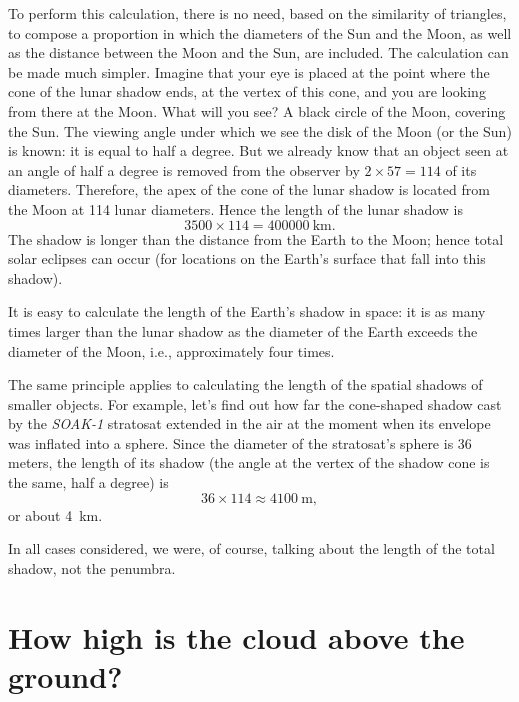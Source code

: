 To perform this calculation, there is no need, based on the similarity of triangles, to compose a proportion in which the diameters of the Sun and the Moon, as well as the distance between the Moon and the Sun, are included. The calculation can be made much simpler. Imagine that your eye is placed at the point where the cone of the lunar shadow ends, at the vertex of this cone, and you are looking from there at the Moon. What will you see? A black circle of the Moon, covering the Sun. The viewing angle under which we see the disk of the Moon (or the Sun) is known: it is equal to half a degree. But we already know that an object seen at an angle of half a degree is removed from the observer by $2 \times 57 = 114$ of its diameters. Therefore, the apex of the cone of the lunar shadow is located from the Moon at 114 lunar diameters. Hence the length of the lunar shadow is
\begin{equation*}%
3500 \times 114 = \SI{400000}{\kilo\meter}.
\end{equation*}
The shadow is longer than the distance from the Earth to the Moon; hence total solar eclipses can occur (for locations on the Earth's surface that fall into this shadow).

It is easy to calculate the length of the Earth's shadow in space: it is as many times larger than the lunar shadow as the diameter of the Earth exceeds the diameter of the Moon, i.e., approximately four times.

The same principle applies to calculating the length of the spatial shadows of smaller objects. For example, let's find out how far the cone-shaped shadow cast by the \emph{SOAK-1} stratosat extended in the air at the moment when its envelope was inflated into a sphere. Since the diameter of the stratosat's sphere is 36 meters, the length of its shadow (the angle at the vertex of the shadow cone is the same, half a degree) is
\begin{equation*}%
36 \times 114 \approx \SI{4100}{\meter},
\end{equation*}
or about \SI{4}{\kilo\meter}.

In all cases considered, we were, of course, talking about the length of the total shadow, not the penumbra.




\section{How high is the cloud above the ground?}
\label{sec-3.14}

